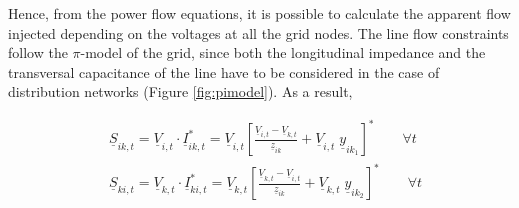 %

Hence, from the power flow equations, it is possible to calculate the apparent flow injected depending on the voltages at all the grid nodes. 
The line flow constraints follow the $\pi$-model of the grid, since both the longitudinal impedance and the transversal capacitance of the line have to be considered in the case of distribution networks (Figure \ref{fig:pimodel}). As a result,

\begin{subequations}
\begin{align*}
& \underline{S}_{ik,t} = \underline{V}_{i,t} \cdot \underline{I}_{ik,t}^{*} = \underline{V}_{i,t} \left[ \frac{\underline{V}_{i,t} - \underline{V}_{k,t}}{\underline{z}_{ik}} + \underline{V}_{i,t} \; \underline{y}_{ik_1} \right]^{*}   \qquad  \forall t  \\
& \underline{S}_{ki,t} = \underline{V}_{k,t} \cdot \underline{I}_{ki,t}^{*} = \underline{V}_{k,t} \left[ \frac{\underline{V}_{k,t} - \underline{V}_{i,t}}{\underline{z}_{ik}} + \underline{V}_{k,t} \;  \underline{y}_{ik_2} \right]^{*}   \qquad  \forall t  
\end{align*}
\end{subequations}


